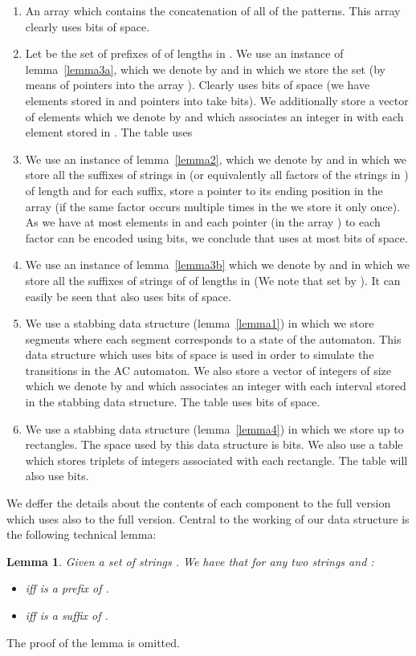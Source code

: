 \documentclass{article}
\newcommand{\?}{\mskip1.5mu}
\newtheorem{lemma}{Lemma}
\begin{document}
\begin{enumerate}
\item An array  which contains the concatenation of all of the patterns. This array clearly uses  bits of space.
\item Let  be the set of prefixes of  of lengths in . We use an instance of lemma~\ref{lemma3a}, which we denote by  and in which we store the set  (by means of pointers into the array ). Clearly  uses  bits of space (we have  elements stored in  and pointers into  take  bits). We additionally store a vector of  elements which we denote by  and which associates an integer in  with each element stored in . The table  uses 


\item We use an instance of lemma~\ref{lemma2}, which we denote by  and in which we store all the suffixes of strings in  (or equivalently all factors of the strings in ) of length  and for each suffix, store a pointer to its ending position in the array  (if the same factor occurs multiple times in the  we store it only once). As we have at most  elements in  and each pointer (in the array ) to each factor can be encoded using  bits, we conclude that  uses at most  bits of space. 
\item We use an instance of lemma~\ref{lemma3b} which we denote by  and in which we store all the suffixes of strings of  of lengths in  (We note that set by ). It can easily be seen that  also uses  bits of space. 
\item We use a  stabbing data structure (lemma~\ref{lemma1}) in which we store  segments where each segment corresponds to a state of the automaton. This data structure which uses  bits of space is used in order to simulate the transitions in the AC automaton. 
We also store a vector of integers of size  which we denote by  and which associates an integer with each interval stored in the  stabbing data structure. The table  uses  bits of space.
\item We use a  stabbing data structure (lemma~\ref{lemma4}) in which we store up to  rectangles. The space used by this data structure is  bits. We also use a table  which stores triplets of integers associated with each rectangle. The table  will also use  bits. 


\end{enumerate}
We deffer the details about the contents of each component to the full version which uses also to the full version.
Central to the working of our data structure is the following technical lemma:
\begin{lemma}
\label{lemma:tech_lemma}
Given a set of strings . We have that for any two strings  and :
\begin{itemize}
\item  iff  is a prefix of . 
\item  iff  is a suffix of .
\end{itemize}
\end{lemma}
The proof of the lemma is omitted.
\end{document}

